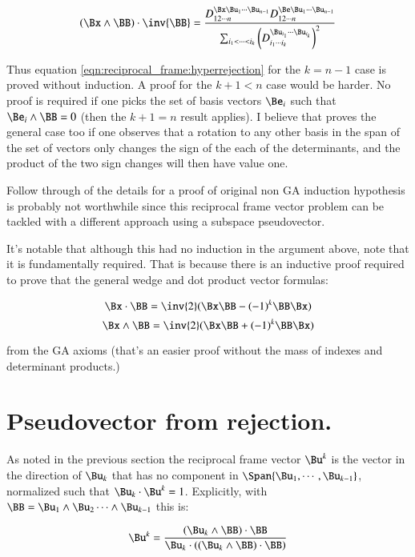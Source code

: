 \begin{equation}\label{eqn:reciprocal_frame:hyperrejectionganminus}
(\Bx \wedge \BB) \cdot \inv{\BB}
=
\frac{
D_{1 2 \cdots n}^{\Bx \Bu_{1} \cdots \Bu_{n-1}} 
D_{1 2 \cdots n}^{\Be \Bu_{1} \cdots \Bu_{n-1}}
}
{
\sum_{i_1 < \cdots < i_{k} } \left(D_{i_1 \cdots i_{k}}^{\Bu_{i_1} \cdots \Bu_{i_{k}}}\right)^2
}
\end{equation}

Thus equation \ref{eqn:reciprocal_frame:hyperrejection} for the $k = n-1$ case is proved without induction.  A proof for the $k+1<n$ case would be harder.
No proof is required if one picks the set of basis vectors ${\Be_i}$ such that $\Be_i \wedge \BB = 0$ (then the $k+1=n$ result applies).
I believe that proves the general case too if one observes that a rotation to any other basis in the span of the set of vectors only
changes the sign of the each of the determinants, and the product of the two sign changes will then have value one.

Follow through of the details for a proof of original non GA induction hypothesis is probably not worthwhile since this
reciprocal frame vector problem can be
tackled with a different approach using a subspace pseudovector.

It's notable that although this had no induction in the argument above, note that it is fundamentally required.
That is because there is an inductive proof
required to prove that the general wedge and dot product vector formulas:

\[
\Bx \cdot \BB = \inv{2}(\Bx \BB - (-1)^k\BB \Bx)
\]
\[
\Bx \wedge \BB = \inv{2}(\Bx \BB + (-1)^k\BB \Bx)
\]

from the GA axioms (that's an easier proof without the mass of indexes and determinant products.) 

\section{Pseudovector from rejection. }

As noted in the previous section the reciprocal frame vector $\Bu^k$ is the vector in the direction of $\Bu_k$ that has no component
in $\Span{ \Bu_1, \cdots, \Bu_{k-1}}$, normalized such that $\Bu_k \cdot \Bu^k = 1$.  Explicitly, with
$\BB = \Bu_1 \wedge \Bu_2 \cdots \wedge \Bu_{k-1}$ this is:

\begin{equation}\label{eqn:reciprocal_frame:reciprej}
\Bu^k = 
\frac
{
(\Bu_k \wedge \BB) \cdot \BB
}
{
\Bu_k \cdot \left((\Bu_k \wedge \BB) \cdot \BB\right)
}
\end{equation}

